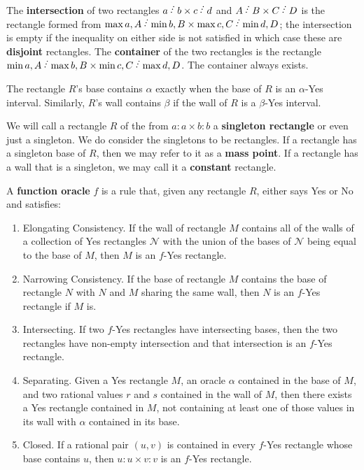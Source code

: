 \documentclass[12pt]{article}
\begin{document}
The \textbf{intersection} of two rectangles $a \lte b \times c \lte d$ and $A \lte B \times C \lte D$ is the rectangle formed from $\max{a,A} \lte \min{b,B} \times \max{c, C} \lte \min{d, D}$; the intersection is empty if the inequality on either side is not satisfied in which case these are \textbf{disjoint} rectangles. The \textbf{container} of the two rectangles is the rectangle $\min{a,A} \lte \max{b,B} \times \min{c, C} \lte \max{d, D}$. The container always exists. 

The rectangle $R$'s base contains $\alpha$ exactly when the base of $R$ is an $\alpha$-Yes interval. Similarly, $R$'s wall contains $\beta$ if the wall of $R$ is a $\beta$-Yes interval.

We will call a rectangle $R$ of the from $a:a\times b:b$ a \textbf{singleton rectangle} or even just a singleton. We do consider the singletons to be rectangles. If a rectangle has a singleton base of $R$, then we may refer to it as a \textbf{mass point}. If a rectangle has a wall that is a singleton, we may call it a \textbf{constant} rectangle. 

A \textbf{function oracle} $f$ is a rule that, given any rectangle $R$, either says Yes or No and satisfies: 
\begin{enumerate}
    \item Elongating Consistency. If the wall of rectangle $M$ contains all of the walls of a collection of Yes rectangles $\mathcal{N}$ with the union of the bases of $\mathcal{N}$ being equal to the base of $M$, then $M$ is an $f$-Yes rectangle.
    \item Narrowing Consistency. If the base of rectangle $M$ contains the base of rectangle $N$ with $N$ and $M$ sharing the same wall, then $N$ is an $f$-Yes rectangle if $M$ is. 
    \item Intersecting. If two $f$-Yes rectangles have intersecting bases, then the two rectangles have non-empty intersection and that intersection is an $f$-Yes rectangle. 
    \item Separating.  Given a Yes rectangle $M$, an oracle $\alpha$ contained in the base of $M$, and two rational values $r$ and $s$ contained in the wall of $M$, then there exists a Yes rectangle contained in $M$, not containing at least one of those values in its wall with $\alpha$ contained in its base.
    \item Closed. If a rational pair $(u,v)$ is contained in every $f$-Yes rectangle whose base contains $u$, then $u:u \times v:v$ is an $f$-Yes rectangle. 
\end{enumerate} 
\end{document}
